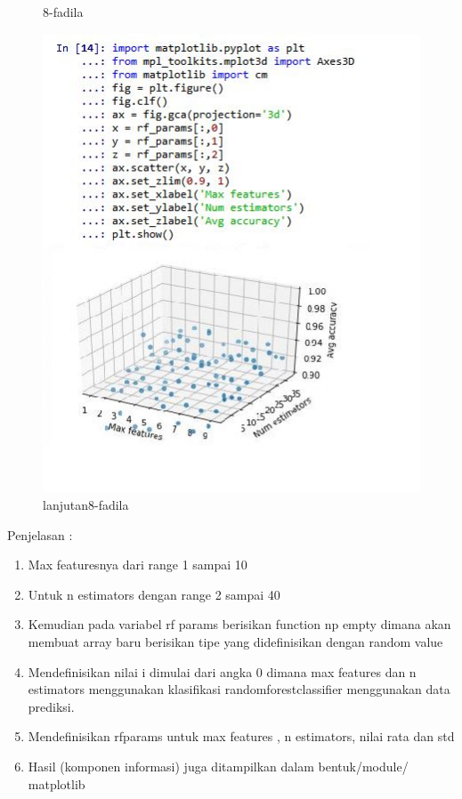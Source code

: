 \begin{enumerate}
\begin{itemize}
\begin{figure}[!hbtp]
\caption{8-fadila}
\label{8-fadila}
\end{figure}
\par
\par
\begin{figure}[!hbtp]
\centering
\includegraphics[scale=0.3]{figures/lanjutan8-fadila.jpg}
\caption{lanjutan8-fadila}
\label{lanjutan8-fadila}
\end{figure}
\par
\end{itemize}
\par Penjelasan :
\begin{enumerate}
\item Max featuresnya dari range 1 sampai 10
\item Untuk n estimators dengan range 2 sampai 40
\item Kemudian pada variabel rf params berisikan function np empty dimana akan membuat array baru berisikan tipe yang didefinisikan dengan random value
\item Mendefinisikan nilai i dimulai dari angka 0 dimana max features dan n estimators menggunakan klasifikasi randomforestclassifier menggunakan data prediksi.
\item Mendefinisikan rfparams untuk max features , n estimators, nilai rata dan std
\item Hasil (komponen informasi) juga ditampilkan dalam bentuk/module/ matplotlib

\end{enumerate}
\end{enumerate}
